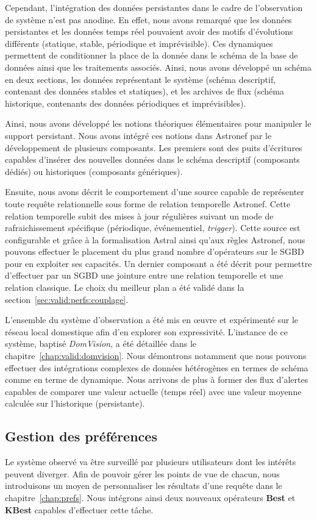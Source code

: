 Cependant, l'intégration des données persistantes dans le cadre de l'observation de système n'est pas anodine. En effet, nous avons remarqué que les données persistantes et les données temps réel pouvaient avoir des motifs d'évolutions différents (statique, stable, périodique et imprévisible). Ces dynamiques permettent de conditionner la place de la donnée dans le schéma de la base de données ainsi que les traitements associés. Ainsi, nous avons développé un schéma en deux sections, les données représentant le système (schéma descriptif, contenant des données stables et statiques), et les archives de flux (schéma historique, contenants des données périodiques et imprévisibles).

Ainsi, nous avons développé les notions théoriques élémentaires pour manipuler le support persistant. Nous avons intégré ces notions dans Astronef par le développement de plusieurs composants. Les premiers sont des puits d'écritures capables d'insérer des nouvelles données dans le schéma descriptif (composants dédiés) ou historiques (composants génériques).

Ensuite, nous avons décrit le comportement d'une source capable de représenter toute requête relationnelle sous forme de relation temporelle Astronef. Cette relation temporelle subit des mises à jour régulières suivant un mode de rafraichissement spécifique (périodique, événementiel, \textit{trigger}). Cette source est configurable et grâce à la formalisation Astral ainsi qu'aux règles Astronef, nous pouvons effectuer le placement du plus grand nombre d'opérateurs sur le SGBD pour en exploiter ses capacités. Un dernier composant a été décrit pour permettre d'effectuer par un SGBD une jointure entre une relation temporelle et une relation classique. Le choix du meilleur plan a été validé dans la section~\ref{sec:valid:perfs:couplage}.

L'ensemble du système d'observation a été mis en œuvre et expérimenté sur le réseau local domestique afin d'en explorer son expressivité. L'instance de ce système, baptisé \textit{DomVision}, a été détaillée dans le chapitre~\ref{chap:valid:domvision}. Nous démontrons notamment que nous pouvons effectuer des intégrations complexes de données hétérogènes en termes de schéma comme en terme de dynamique. Nous arrivons de plus à former des flux d'alertes capables de comparer une valeur actuelle (temps réel) avec une valeur moyenne calculée sur l'historique (persistante).

\subsection{Gestion des préférences}
Le système observé va être surveillé par plusieurs utilisateurs dont les intérêts peuvent diverger. Afin de pouvoir gérer les points de vue de chacun, nous introduisons un moyen de personnaliser les résultats d'une requête dans le chapitre~\ref{chap:prefs}. Nous intégrons ainsi deux nouveaux opérateurs \textbf{Best} et \textbf{KBest} capables d'effectuer cette tâche.

